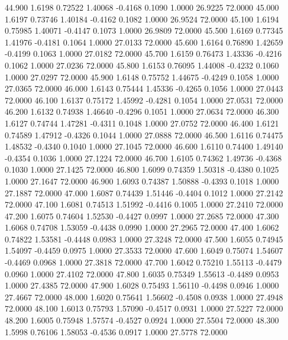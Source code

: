   44.900   1.6198   0.72522   1.40068  -0.4168   0.1090   1.0000  26.9225  72.0000
  45.000   1.6197   0.73746   1.40184  -0.4162   0.1082   1.0000  26.9524  72.0000
  45.100   1.6194   0.75985   1.40071  -0.4147   0.1073   1.0000  26.9809  72.0000
  45.500   1.6169   0.77345   1.41976  -0.4181   0.1064   1.0000  27.0133  72.0000
  45.600   1.6164   0.76890   1.42659  -0.4199   0.1063   1.0000  27.0182  72.0000
  45.700   1.6159   0.76473   1.43336  -0.4216   0.1062   1.0000  27.0236  72.0000
  45.800   1.6153   0.76095   1.44008  -0.4232   0.1060   1.0000  27.0297  72.0000
  45.900   1.6148   0.75752   1.44675  -0.4249   0.1058   1.0000  27.0365  72.0000
  46.000   1.6143   0.75444   1.45336  -0.4265   0.1056   1.0000  27.0443  72.0000
  46.100   1.6137   0.75172   1.45992  -0.4281   0.1054   1.0000  27.0531  72.0000
  46.200   1.6132   0.74938   1.46640  -0.4296   0.1051   1.0000  27.0634  72.0000
  46.300   1.6127   0.74744   1.47281  -0.4311   0.1048   1.0000  27.0752  72.0000
  46.400   1.6121   0.74589   1.47912  -0.4326   0.1044   1.0000  27.0888  72.0000
  46.500   1.6116   0.74475   1.48532  -0.4340   0.1040   1.0000  27.1045  72.0000
  46.600   1.6110   0.74400   1.49140  -0.4354   0.1036   1.0000  27.1224  72.0000
  46.700   1.6105   0.74362   1.49736  -0.4368   0.1030   1.0000  27.1425  72.0000
  46.800   1.6099   0.74359   1.50318  -0.4380   0.1025   1.0000  27.1647  72.0000
  46.900   1.6093   0.74387   1.50888  -0.4393   0.1018   1.0000  27.1887  72.0000
  47.000   1.6087   0.74439   1.51446  -0.4404   0.1012   1.0000  27.2142  72.0000
  47.100   1.6081   0.74513   1.51992  -0.4416   0.1005   1.0000  27.2410  72.0000
  47.200   1.6075   0.74604   1.52530  -0.4427   0.0997   1.0000  27.2685  72.0000
  47.300   1.6068   0.74708   1.53059  -0.4438   0.0990   1.0000  27.2965  72.0000
  47.400   1.6062   0.74822   1.53581  -0.4448   0.0983   1.0000  27.3248  72.0000
  47.500   1.6055   0.74945   1.54097  -0.4459   0.0975   1.0000  27.3533  72.0000
  47.600   1.6049   0.75074   1.54607  -0.4469   0.0968   1.0000  27.3818  72.0000
  47.700   1.6042   0.75210   1.55113  -0.4479   0.0960   1.0000  27.4102  72.0000
  47.800   1.6035   0.75349   1.55613  -0.4489   0.0953   1.0000  27.4385  72.0000
  47.900   1.6028   0.75493   1.56110  -0.4498   0.0946   1.0000  27.4667  72.0000
  48.000   1.6020   0.75641   1.56602  -0.4508   0.0938   1.0000  27.4948  72.0000
  48.100   1.6013   0.75793   1.57090  -0.4517   0.0931   1.0000  27.5227  72.0000
  48.200   1.6005   0.75948   1.57574  -0.4527   0.0924   1.0000  27.5504  72.0000
  48.300   1.5998   0.76106   1.58053  -0.4536   0.0917   1.0000  27.5778  72.0000
